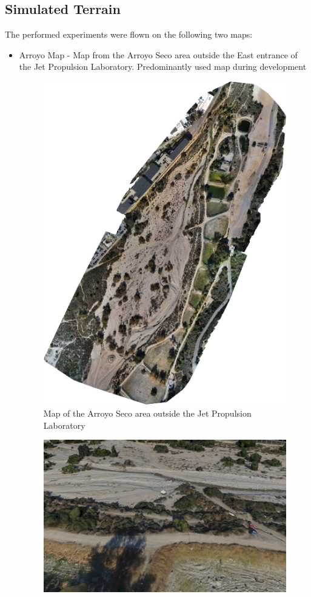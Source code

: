 \subsection{Simulated Terrain}\label{subsec:terrain}
The performed experiments were flown on the following two maps:
\begin{itemize}
    \item Arroyo Map - Map from the Arroyo Seco area outside the East entrance of the Jet Propulsion Laboratory. Predominantly used map during development
    \begin{figure}[h]
        \centering
        \includegraphics[scale=0.5]{images/evaluation/arroyo.png}
        \caption{Map of the Arroyo Seco area outside the Jet Propulsion Laboratory}
    \end{figure}
    \clearpage%
    \begin{figure}[h]
        \centering
        \includegraphics[scale=0.20]{images/evaluation/arroyo_map.png}

\end{figure}
\end{itemize}
